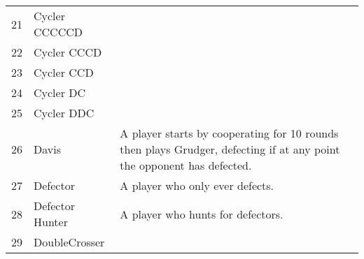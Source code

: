 \begin{table}[H]
\begin{adjustbox}{height=0.7\textwidth, width=1.1\textwidth}
\begin{tabular}{rlll}
	21   & Cycler CCCCCD               &                                                                                                                                   \\
	22   & Cycler CCCD                 &                                                                                                                                   \\
	23   & Cycler CCD                  &                                                                                                                                   \\
	24   & Cycler DC                   &                                                                                                                                   \\
	25   & Cycler DDC                  &                                                                                                                                   \\
	26   & Davis                       & A player starts by cooperating for 10 rounds then plays Grudger,
	defecting if at any point the opponent has defected.                                                                                                                                                                                                                                                                                                                                                                                                                                                                                                                                                                                                                                                                                                                                                                                                                                                                                                \\
	27   & Defector                    & A player who only ever defects.                                                                                                   \\
	28   & Defector Hunter             & A player who hunts for defectors.                                                                                                 \\
	29   & DoubleCrosser               &                                                                                                                                   \\

\end{tabular}
\end{adjustbox}
\end{table}
